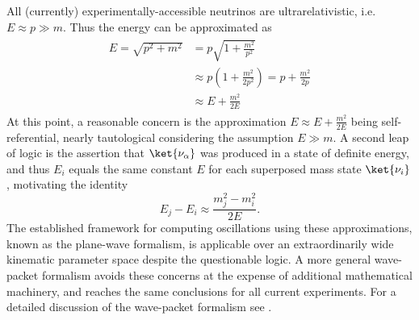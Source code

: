 All (currently) experimentally-accessible neutrinos are ultrarelativistic,
i.e. $E \approx p \gg m$.
Thus the energy can be approximated as
\begin{align}\label{eq:energy_approx}
    \begin{split}
        E = \sqrt{p^2 + m^2}
        &= p\sqrt{1 + \frac{m^2}{p^2}} \\
        &\approx p\left(1 + \frac{m^2}{2p^2}\right) = p + \frac{m^2}{2p} \\
        &\approx E + \frac{m^2}{2E}
    \end{split}
\end{align}
At this point, a reasonable concern is the approximation $E \approx E + \frac{m^2}{2E}$
being self-referential, nearly tautological considering the assumption $E \gg m$.
A second leap of logic is the assertion that
$\ket{\nu_\alpha}$ was produced in a state of definite energy,
and thus $E_i$ equals the same constant $E$ for each superposed mass state $\ket{\nu_i}$,
motivating the identity
\begin{equation}\label{eq:msq_approx}
    E_j - E_i \approx \frac{m_j^2 - m_i^2}{2E}.
\end{equation}
The established framework for computing oscillations
using these approximations, known as the plane-wave formalism,
is applicable over an extraordinarily wide
kinematic parameter space despite the questionable logic.
A more general wave-packet formalism avoids these concerns
at the expense of additional mathematical machinery,
and reaches the same conclusions for all current experiments.
For a detailed discussion of the wave-packet formalism see .

